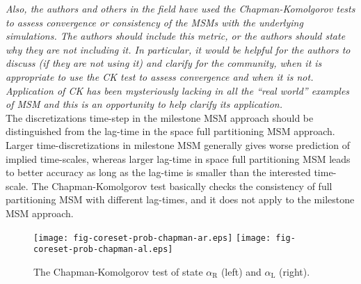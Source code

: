 \documentclass{article}
\begin{document}
\textit{ Also, the authors and others in the field have used the
  Chapman-Komolgorov tests to assess convergence or consistency of the
  MSMs with the underlying simulations.  The authors should include
  this metric, or the authors should state why they are not including
  it.  In particular, it would be helpful for the authors to discuss
  (if they are not using it) and clarify for the community, when it is
  appropriate to use the CK test to assess convergence and when it is
  not. Application of CK has been mysteriously lacking in all the
  “real world” examples of MSM and this is an opportunity to help
  clarify its application.
}\\

The discretizations time-step in the milestone MSM approach should be
distinguished from the lag-time in the space full partitioning MSM
approach. Larger time-discretizations in milestone MSM generally gives
worse prediction of implied time-scales, whereas larger lag-time in
space full partitioning MSM leads to better accuracy as long as the
lag-time is smaller than the interested time-scale. The
Chapman-Komolgorov test basically checks the consistency of full
partitioning MSM with different lag-times, and it does not apply to
the milestone MSM approach.

\begin{figure}
  \centering
  \texttt{[image: fig-coreset-prob-chapman-ar.eps]}
  \texttt{[image: fig-coreset-prob-chapman-al.eps]}
  \caption{The Chapman-Komolgorov test of state $\alpha_{\textrm{R}}$ (left) and $\alpha_{\textrm{L}}$ (right).}
\end{figure}
\end{document}
